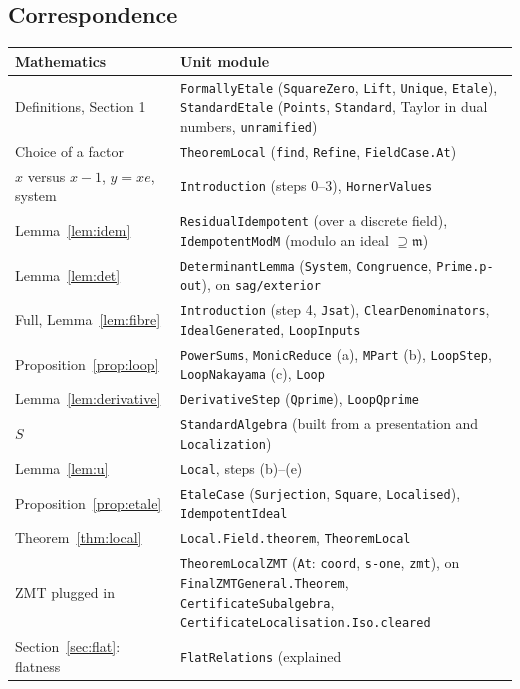 \documentclass[11pt]{amsart}
\numberwithin{equation}{section}
\theoremstyle{definition}
\theoremstyle{remark}
\newcommand{\m}{\mathfrak m}
\newcommand{\code}[1]{\texttt{#1}}
\begin{document}
\subsection{Correspondence}
{\small
\begin{longtable}{>{\raggedright\arraybackslash}p{}>{\raggedright\arraybackslash}p{}}
\toprule
Mathematics & Unit module \\
\midrule
\endhead
Definitions, Section 1 & \code{FormallyEtale} (\code{SquareZero}, \code{Lift},
 \code{Unique}, \code{Etale}), \code{StandardEtale} (\code{Points},
 \code{Standard}, Taylor in dual numbers, \code{unramified})\\
Choice of a factor & \code{TheoremLocal} (\code{find}, \code{Refine},
 \code{FieldCase.At})\\
$x$ versus $x-1$, $y=xe$, system & \code{Introduction} (steps 0--3),
 \code{HornerValues}\\
Lemma~\ref{lem:idem} & \code{ResidualIdempotent} (over a discrete field),
 \code{IdempotentModM} (modulo an ideal $\supseteq\m$)\\
Lemma~\ref{lem:det} & \code{DeterminantLemma} (\code{System},
 \code{Congruence}, \code{Prime.p-out}), on \code{sag/exterior}\\
Full, Lemma~\ref{lem:fibre} & \code{Introduction} (step 4, \code{Jsat}),
 \code{ClearDenominators}, \code{IdealGenerated}, \code{LoopInputs}\\
Proposition~\ref{prop:loop} & \code{PowerSums}, \code{MonicReduce} (a),
 \code{MPart} (b), \code{LoopStep}, \code{LoopNakayama} (c), \code{Loop}\\
Lemma~\ref{lem:derivative} & \code{DerivativeStep} (\code{Qprime}),
 \code{LoopQprime}\\
$S$ & \code{StandardAlgebra} (built from a presentation and
 \code{Localization})\\
Lemma~\ref{lem:u} & \code{Local}, steps (b)--(e)\\
Proposition~\ref{prop:etale} & \code{EtaleCase} (\code{Surjection},
 \code{Square}, \code{Localised}), \code{IdempotentIdeal}\\
Theorem~\ref{thm:local} & \code{Local.Field.theorem}, \code{TheoremLocal}\\
ZMT plugged in & \code{TheoremLocalZMT} (\code{At}: \code{coord},
 \code{s-one}, \code{zmt}), on \code{FinalZMTGeneral.Theorem},
 \code{CertificateSubalgebra}, \code{CertificateLocalisation.Iso.cleared}\\
Section~\ref{sec:flat}: flatness & \code{FlatRelations} (explained

\end{longtable}}
\end{document}
